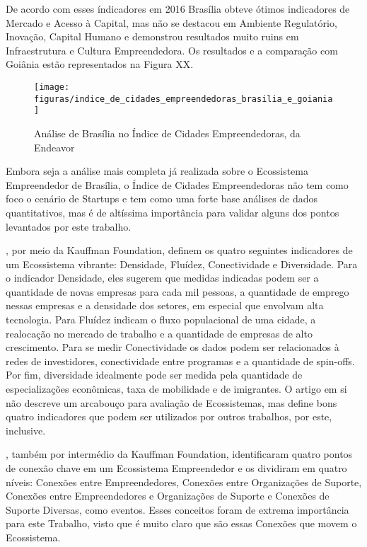 De acordo com esses índicadores em 2016 Brasília obteve ótimos indicadores de Mercado e Acesso à Capital, mas não se destacou em Ambiente Regulatório, Inovação, Capital Humano e demonstrou resultados muito ruins em Infraestrutura e Cultura Empreendedora. Os resultados e a comparação com Goiânia estão representados na Figura XX.

\begin{figure}[!htb]
\centering
\texttt{[image: figuras/indice\_de\_cidades\_empreendedoras\_brasilia\_e\_goiania]}
\caption{Análise de Brasília no Índice de Cidades Empreendedoras, da Endeavor}
\label{Rotulo}
\end{figure}

Embora seja a análise mais completa já realizada sobre o Ecossistema Empreendedor de Brasília, o Índice de Cidades Empreendedoras não tem como foco o cenário de Startups e tem como uma forte base análises de dados quantitativos, mas é de altíssima importância para validar alguns dos pontos levantados por este trabalho.

, por meio da Kauffman Foundation, definem os quatro seguintes indicadores de um Ecossistema vibrante: Densidade, Fluídez, Conectividade e Diversidade. Para o indicador Densidade, eles sugerem que medidas indicadas podem ser a quantidade de novas empresas para cada mil pessoas, a quantidade de emprego nessas empresas e a densidade dos setores, em especial que envolvam alta tecnologia. Para Fluídez indicam o fluxo populacional de uma cidade, a realocação no mercado de trabalho e a quantidade de empresas de alto crescimento. Para se medir Conectividade os dados podem ser relacionados à redes de investidores, conectividade entre programas e a quantidade de spin-offs. Por fim, diversidade idealmente pode ser medida pela quantidade de especializações econômicas, taxa de mobilidade e de imigrantes. O artigo em si não descreve um arcabouço para avaliação de Ecossistemas, mas define bons quatro indicadores que podem ser utilizados por outros trabalhos, por este, inclusive. 

, também por intermédio da Kauffman Foundation, identificaram quatro pontos de conexão chave em um Ecossistema Empreendedor e os dividiram em quatro níveis: Conexões entre Empreendedores, Conexões entre Organizações de Suporte, Conexões entre Empreendedores e Organizações de Suporte e Conexões de Suporte Diversas, como eventos. Esses conceitos foram de extrema importância para este Trabalho, visto que é muito claro que são essas Conexões que movem o Ecossistema.

